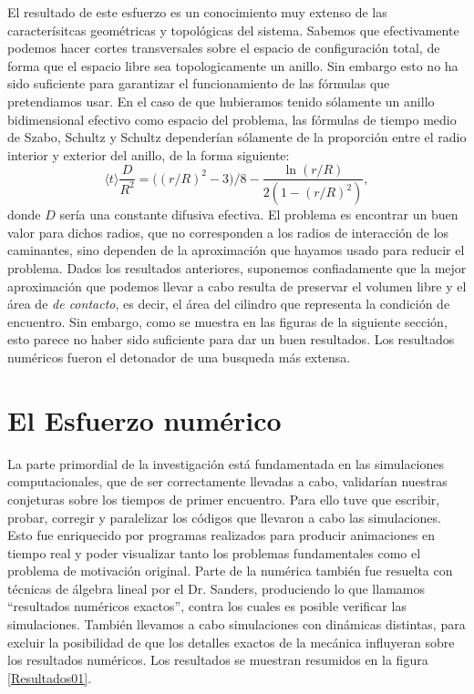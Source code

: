 \documentclass[letterpaperr,12pt]{article}
\begin{document}
El resultado de este esfuerzo es un conocimiento muy extenso
de las caracterísitcas geométricas y topológicas del sistema. Sabemos
que efectivamente podemos hacer cortes transversales sobre el espacio
de configuración total, de forma que el espacio libre sea topologicamente un
anillo. Sin embargo esto no ha sido suficiente para garantizar
el funcionamiento de las fórmulas que pretendiamos usar.
En el caso de que hubieramos tenido sólamente un anillo bidimensional
efectivo como espacio del problema, las fórmulas de tiempo medio
de Szabo, Schultz y Schultz dependerían sólamente de la proporción
entre el radio interior y exterior del anillo, de la forma siguiente:
\begin{equation}\label{Szabo01}
\langle t \rangle \frac{D}{R^2}=
\bigl((r/R)^2-3\bigr)/8 -\frac{\ln (r/R)}{2(1-(r/R)^2)},
\end{equation}
donde $D$ sería una constante difusiva efectiva.
El problema es encontrar un buen valor para dichos radios, que no corresponden
a los radios de interacción de los caminantes, sino dependen de la aproximación
que hayamos usado para reducir el problema. Dados los resultados anteriores,
suponemos confiadamente que la mejor aproximación que podemos llevar a cabo
resulta de preservar el volumen libre y el área de \emph{de contacto},
es decir, el área del cilindro que representa la condición de encuentro.
Sin embargo, como se muestra en las figuras de la siguiente
sección, esto parece no haber sido suficiente para dar un buen resultados. 
Los resultados numéricos fueron el detonador de una busqueda más extensa.


\section{El Esfuerzo numérico}

La parte primordial de la investigación está fundamentada en las 
simulaciones computacionales, que de ser correctamente llevadas a cabo,
validarían nuestras conjeturas sobre los tiempos de primer encuentro.
Para ello tuve que escribir, probar, corregir y paralelizar
los códigos que llevaron a cabo las simulaciones. Esto fue enriquecido
por programas realizados para producir animaciones en tiempo real
y poder visualizar tanto los problemas fundamentales como el problema
de motivación original. Parte de la numérica también fue resuelta
con técnicas de álgebra lineal por el Dr. Sanders, produciendo
lo que llamamos ``resultados numéricos exactos'', contra los
cuales es posible verificar las simulaciones. También llevamos a cabo
simulaciones con dinámicas distintas, para excluir la posibilidad de
que los detalles exactos de la mecánica influyeran sobre los resultados numéricos.
Los resultados se muestran resumidos en la figura \ref{Resultados01}.
\end{document}

